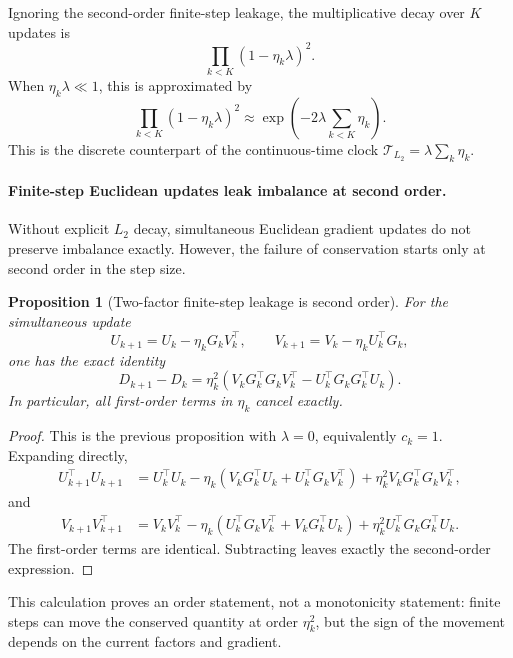 \documentclass{article}
\newtheorem{proposition}{Proposition}
\begin{document}
Ignoring the second-order finite-step leakage, the multiplicative decay
over \(K\) updates is
\[
    \prod_{k<K}(1-\eta_k\lambda)^2.
\]
When \(\eta_k\lambda\ll1\), this is approximated by
\[
    \prod_{k<K}(1-\eta_k\lambda)^2
    \approx
    \exp\!\left(
        -2\lambda\sum_{k<K}\eta_k
    \right).
\]
This is the discrete counterpart of the continuous-time clock
\(\mathcal T_{L_2}=\lambda\sum_k\eta_k\).

\paragraph{Finite-step Euclidean updates leak imbalance at second order.}
Without explicit \(L_2\) decay, simultaneous Euclidean gradient updates
do not preserve imbalance exactly.  However, the failure of conservation
starts only at second order in the step size.

\begin{proposition}[Two-factor finite-step leakage is second order]
For the simultaneous update
\[
    U_{k+1}=U_k-\eta_k G_kV_k^\top,
    \qquad
    V_{k+1}=V_k-\eta_k U_k^\top G_k,
\]
one has the exact identity
\[
    D_{k+1}-D_k
    =
    \eta_k^2
    \left(
        V_kG_k^\top G_kV_k^\top
        -
        U_k^\top G_kG_k^\top U_k
    \right).
\]
In particular, all first-order terms in \(\eta_k\) cancel exactly.
\end{proposition}

\begin{proof}
This is the previous proposition with \(\lambda=0\), equivalently
\(c_k=1\).  Expanding directly,
\[
\begin{aligned}
    U_{k+1}^\top U_{k+1}
    &=
    U_k^\top U_k
    -
    \eta_k
    \left(
        V_kG_k^\top U_k
        +
        U_k^\top G_kV_k^\top
    \right)
    +
    \eta_k^2V_kG_k^\top G_kV_k^\top ,
\end{aligned}
\]
and
\[
\begin{aligned}
    V_{k+1}V_{k+1}^\top
    &=
    V_kV_k^\top
    -
    \eta_k
    \left(
        U_k^\top G_kV_k^\top
        +
        V_kG_k^\top U_k
    \right)
    +
    \eta_k^2U_k^\top G_kG_k^\top U_k .
\end{aligned}
\]
The first-order terms are identical.  Subtracting leaves exactly the
second-order expression.
\end{proof}

This calculation proves an order statement, not a monotonicity statement:
finite steps can move the conserved quantity at order \(\eta_k^2\), but
the sign of the movement depends on the current factors and gradient.
\end{document}
